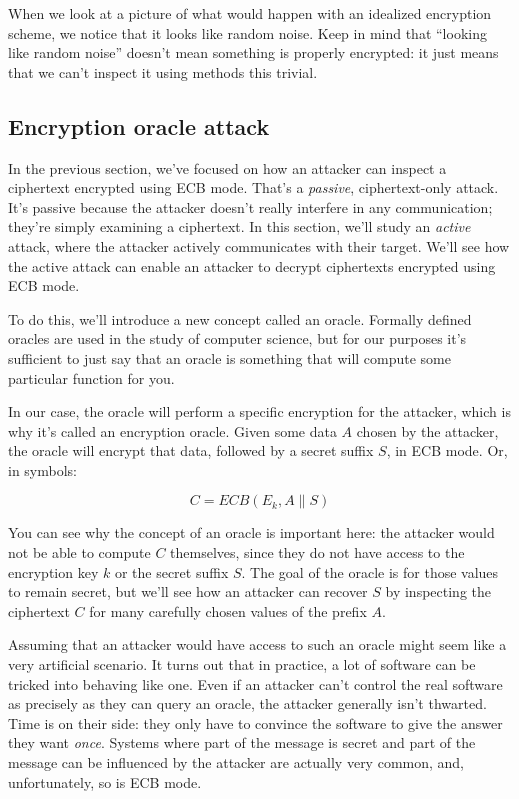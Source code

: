 \documentclass[11pt,ebook,table,dvipsnames]{memoir}
\begin{document}
When we look at a picture of what would happen with an idealized
encryption scheme, we notice that it looks like random noise. Keep in
mind that \enquote{looking like random noise} doesn't mean something is
properly encrypted: it just means that we can't inspect it using
methods this trivial.
\subsection{Encryption oracle attack}
\label{sec-2-3-2-2}

In the previous section, we've focused on how an attacker can inspect
a ciphertext encrypted using \gls{ECB mode}. That's a \emph{passive},
ciphertext-only attack. It's passive because the attacker doesn't
really interfere in any communication; they're simply examining a
ciphertext. In this section, we'll study an \emph{active} attack, where the
attacker actively communicates with their target. We'll see how the
active attack can enable an attacker to decrypt ciphertexts encrypted
using ECB mode.

To do this, we'll introduce a new concept called an \gls{oracle}.
Formally defined oracles are used in the study of computer science,
but for our purposes it's sufficient to just say that an oracle is
something that will compute some particular function for you.

In our case, the oracle will perform a specific encryption for the
attacker, which is why it's called an \gls{encryption oracle}. Given
some data $A$ chosen by the attacker, the oracle will encrypt that
data, followed by a secret suffix $S$, in ECB mode. Or, in symbols:

\[
C = ECB(E_k, A \| S)
\]

You can see why the concept of an oracle is important here: the
attacker would not be able to compute $C$ themselves, since they do
not have access to the encryption key $k$ or the secret suffix $S$.
The goal of the oracle is for those values to remain secret, but we'll
see how an attacker can recover $S$ by inspecting the ciphertext $C$
for many carefully chosen values of the prefix $A$.

Assuming that an attacker would have access to such an oracle might
seem like a very artificial scenario. It turns out that in practice, a
lot of software can be tricked into behaving like one. Even if an
attacker can't control the real software as precisely as they can
query an oracle, the attacker generally isn't thwarted. Time is on
their side: they only have to convince the software to give the answer
they want \emph{once}. Systems where part of the message is secret and part
of the message can be influenced by the attacker are actually very
common, and, unfortunately, so is ECB mode.
\end{document}
